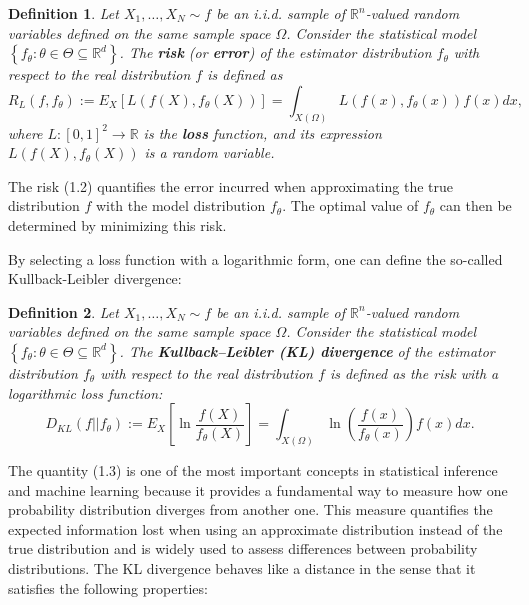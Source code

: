 \documentclass{report}
\newtheorem{definition}{Definition}[chapter]
\begin{document}
\begin{definition}
Let $X_1,\dots,X_N \sim f$ be an i.i.d. sample of $\mathbb{R}^n$-valued random variables defined on the same sample space $\Omega$. Consider the statistical model $\left\{f_\theta :\theta\in\Theta\subseteq\mathbb{R}^d\right\}$. The \textbf{risk} (or \textbf{error}) of the estimator distribution $f_\theta$ with respect to the real distribution $f$ is defined as
\begin{equation}
R_L(f,f_\theta) := E_X[L(f(X),f_\theta(X))] = \int_{X(\Omega)} L(f(x),f_\theta(x))f(x)dx,
\end{equation}
where $L : [0,1]^2 \to \mathbb{R}$ is the \textbf{loss} function, and its expression $L(f(X), f_\theta(X))$ is a random variable.
\end{definition}

The risk (1.2) quantifies the error incurred when approximating the true distribution $f$ with the model distribution $f_\theta$. The optimal value of $f_\theta$ can then be determined by minimizing this risk.

By selecting a loss function with a logarithmic form, one can define the so-called Kullback-Leibler divergence:

\begin{definition}
Let $X_1,\dots,X_N \sim f$ be an i.i.d. sample of $\mathbb{R}^n$-valued random variables defined on the same sample space $\Omega$. Consider the statistical model $\left\{f_\theta :\theta\in\Theta\subseteq\mathbb{R}^d\right\}$. The \textbf{Kullback–Leibler (KL) divergence} of the estimator distribution $f_\theta$ with respect to the real distribution $f$ is defined as the risk with a logarithmic loss function:
\begin{equation}
D_{KL}(f||f_\theta) := E_X\left [\ln \frac{f(X)}{f_\theta(X)} \right] = \int_{X(\Omega)} \ln \left ( \frac{f(x)}{f_\theta(x)} \right )f(x)dx.
\end{equation}
\end{definition}

The quantity (1.3) is one of the most important concepts in statistical inference and machine learning because it provides a fundamental way to measure how one probability distribution diverges from another one. This measure quantifies the expected information lost when using an approximate distribution instead of the true distribution and is widely used to assess differences between probability distributions. The KL divergence behaves like a distance in the sense that it satisfies the following properties:
\end{document}
